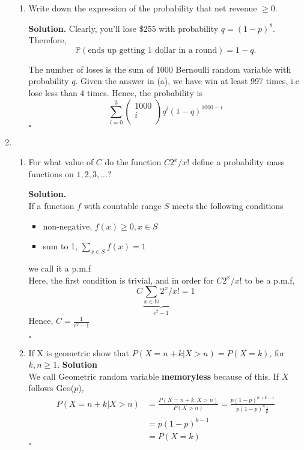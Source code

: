 \documentclass[12pt]{article}
\begin{document}
\begin{enumerate}
\begin{enumerate}
    \item Write down the expression of the probability that net revenue \(\geq 0\).

    \textbf{Solution.} 
    Clearly, you'll lose \$255 with probability $q=(1-p)^8$. Therefore, 
\[\mathbb{P}(\text{ends up getting $1$ dollar in a round})=1-q.\]

    The number of loses is the sum of 1000 Bernoulli random variable with probability \(q\). 
    Given the answer in (a), we have win at least 997 times, i.e lose less than 4 times. 
    Hence, the probability is 
    \[
        \sum_{i=0}^{3} \begin{pmatrix}
             1000 \\
             i \\
        \end{pmatrix}q^i(1-q)^{1000-i}
    \] 
        \hspace{\linewidth}\(\square\) 
\end{enumerate}




\item
\begin{enumerate}
\item For what value of $C$ do the function $C2^{x}/x!$  define a probability mass functions on $1,2,3,...$?

\textbf{Solution.}\\
If a function \(f\) with countable range $S$ meets the following conditions 
\begin{itemize}
    \item non-negative, \(f(x) \geq  0 , x \in S\)
    \item sum to 1, \(\sum_{x \in S} f(x) = 1 \)  
\end{itemize}
we call it a p.m.f \\
Here, the first condition is trivial, and in order for \(C2^x / x!\) to be a p.m.f, 
\[
    C \underbrace{\sum_{x \in \mathbb{N}} 2^x / x!}_{e^2 -1} = 1 
\] 
Hence, \(C = \frac{1}{e^2 -1}\) 

\hspace{\linewidth}\(\square\)   

\item
If X is geometric show that \(P(X = n + k | X > n) = P(X = k)\), for \(k,n \geq 1\).
\textbf{Solution} \\
We call Geometric random variable \textbf{memoryless} because of this. 
If \(X\) follows Geo(\(p\)), 
\begin{equation*}
   \begin{aligned}
    P(X = n+k | X > n) &= \frac{P(X = n+k, X > n)}{P(X > n)} = \frac{p(1-p)^{n+k-1}}{p(1-p)^{n} \frac{1}{p}} 
    \\ & = p(1-p)^{k-1} 
    \\ &= P(X = k)
   \end{aligned} 
\end{equation*}
\hspace{\linewidth} $\square$  
\end{enumerate}


\end{enumerate}
\end{document}

